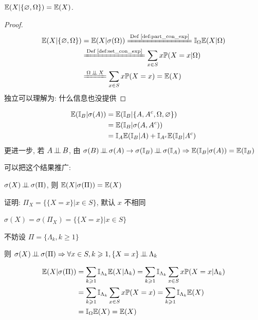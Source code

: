 \begin{example}
$\mathbb E(X|\{\varnothing,\Omega\})=\mathbb E(X)$.
\end{example}
\begin{proof}
\[
\begin{aligned}
        \EE(X|\{\emp,\Omega\})
        &=\EE(X|\sigma(\Omega))
        \xlongequal{\text{Def \ref{def:part_con_exp}}}\II_{\Omega}\EE(X|\Omega)\\
        &\xlongequal{\text{Def \ref{def:set_con_exp}}}\sum_{x\in S}x\PP(X=x|\Omega)\\
        &\xlongequal{\Omega\ind X}\sum_{x\in S}x\PP(X=x)=\EE(X)
\end{aligned}
\]
独立可以理解为: 什么信息也没提供
\end{proof}

\begin{example}\label{exa:con_exp_indic}
    \[
    \begin{aligned}
        \mathbb E(\mathbb I_B|\sigma(A))&=\mathbb E(\mathbb I_B|\{A,A^c,\Omega,\varnothing\})\\
        &=\mathbb E(\mathbb I_B|\sigma(A,A^c))\\
        &=\mathbb I_A\mathbb E(\mathbb I_B|A)+\mathbb I_{A^c}\mathbb E(\mathbb I_B|A^c)
    \end{aligned}
    \]
    更进一步, 若 $A\operatorname{\perp\!\!\!\perp} B$, 由 $\sigma(B)\operatorname{\perp\!\!\!\perp} \sigma(A)\rightarrow \sigma(\mathbb I_B)\operatorname{\perp\!\!\!\perp}\sigma(\mathbb I_A)\Rightarrow \mathbb E(\mathbb I_B|\sigma(A))=\mathbb E(\mathbb I_B)$
\end{example}

可以把这个结果推广: 

\begin{property}
$\sigma(X)\operatorname{\perp\!\!\!\perp} \sigma(\Pi)$, 则 $\mathbb E(X|\sigma(\Pi))=\mathbb E(X)$
\end{property}

证明: $\Pi_X=\{\{X=x\}|x\in S\}$, 默认 $x$ 不相同

$\sigma(X)=\sigma(\Pi_X)=\{\{X=x\}|x\in S\}$

不妨设 $\Pi=\{\Lambda_k,k\geq 1\}$

则 $\sigma(X)\operatorname{\perp\!\!\!\perp} \sigma(\Pi)\Rightarrow \forall x\in S, k\geqslant 1, \{X=x\}\operatorname{\perp\!\!\!\perp} \Lambda_k$

\[
\begin{aligned}
    \mathbb E(X|\sigma(\Pi)) &= \sum_{k\geqslant 1}\mathbb I_{\Lambda_k}\mathbb E(X|\Lambda_k)
    =\sum_{k\geqslant 1}\mathbb I_{\Lambda_k}\sum_{x\in S}x\mathbb{P}(X=x|\Lambda_k)\\
    &=\sum_{k\geqslant 1}\mathbb I_{\Lambda_k}\sum_{x\in S}x\mathbb{P}(X=x)
    =\sum_{k\geqslant 1}\mathbb I_{\Lambda_k}\mathbb E(X)\\
    &=\mathbb I_{\Omega}\mathbb E(X)
    =\mathbb E(X)
\end{aligned}
\]

